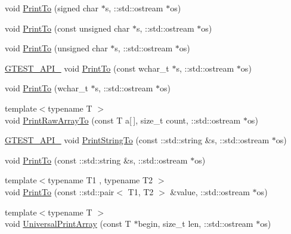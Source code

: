 \begin{DoxyCompactItemize}
\item 
void \mbox{\hyperlink{namespacetesting_1_1internal_a1320096b116f8cc4b688acbd5b783051}{Print\+To}} (signed char $\ast$s, \+::std\+::ostream $\ast$os)
\item 
void \mbox{\hyperlink{namespacetesting_1_1internal_a42c591f2164ad105b502a9262333aed2}{Print\+To}} (const unsigned char $\ast$s, \+::std\+::ostream $\ast$os)
\item 
void \mbox{\hyperlink{namespacetesting_1_1internal_a7fae797c500d66d0f5a9db4f205e3416}{Print\+To}} (unsigned char $\ast$s, \+::std\+::ostream $\ast$os)
\item 
\mbox{\hyperlink{gtest-port_8h_aa73be6f0ba4a7456180a94904ce17790}{G\+T\+E\+S\+T\+\_\+\+A\+P\+I\+\_\+}} void \mbox{\hyperlink{namespacetesting_1_1internal_afb038075e9e2166d1d9158a19e0eed23}{Print\+To}} (const wchar\+\_\+t $\ast$s, \+::std\+::ostream $\ast$os)
\item 
void \mbox{\hyperlink{namespacetesting_1_1internal_a8d41baa371fad3eb5a3dbe1bbc02c290}{Print\+To}} (wchar\+\_\+t $\ast$s, \+::std\+::ostream $\ast$os)
\item 
{\footnotesize template$<$typename T $>$ }\\void \mbox{\hyperlink{namespacetesting_1_1internal_ad3013b6b4c825edee9fe18ff1d982faa}{Print\+Raw\+Array\+To}} (const T a\mbox{[}$\,$\mbox{]}, size\+\_\+t count, \+::std\+::ostream $\ast$os)
\item 
\mbox{\hyperlink{gtest-port_8h_aa73be6f0ba4a7456180a94904ce17790}{G\+T\+E\+S\+T\+\_\+\+A\+P\+I\+\_\+}} void \mbox{\hyperlink{namespacetesting_1_1internal_a8b53e46cea3f8bdfc9342057c4f6ba62}{Print\+String\+To}} (const \+::std\+::string \&s, \+::std\+::ostream $\ast$os)
\item 
void \mbox{\hyperlink{namespacetesting_1_1internal_af59b4f5d83276cd807c45063b14bad44}{Print\+To}} (const \+::std\+::string \&s, \+::std\+::ostream $\ast$os)
\item 
{\footnotesize template$<$typename T1 , typename T2 $>$ }\\void \mbox{\hyperlink{namespacetesting_1_1internal_af2c33928facbf2edf7af564278724d98}{Print\+To}} (const \+::std\+::pair$<$ T1, T2 $>$ \&value, \+::std\+::ostream $\ast$os)
\item 
{\footnotesize template$<$typename T $>$ }\\void \mbox{\hyperlink{namespacetesting_1_1internal_ad79d71c3110f8eb24ab352d68f29436a}{Universal\+Print\+Array}} (const T $\ast$begin, size\+\_\+t len, \+::std\+::ostream $\ast$os)
\item 

\end{DoxyCompactItemize}
